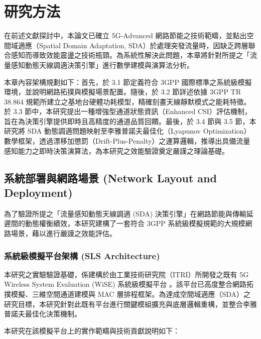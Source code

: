 
\section{研究方法}
\label{sec:methodology}
在前述文獻探討中，本論文已確立 5G-Advanced 網路節能之技術範疇，並點出空間域適應（Spatial Domain Adaptation, SDA）於處理突發流量時，因缺乏跨層聯合感知而導致效能震盪之技術瓶頸。為系統性解決此問題，本章將針對所提之「流量感知動態天線調適決策引擎」進行數學建模與演算法分析。

本章內容架構規劃如下：首先，於 3.1 節定義符合 3GPP 國際標準之系統級模擬環境，並說明網路拓撲與模擬場景配置。隨後，於 3.2 節詳述依據 3GPP TR 38.864 規範所建立之基地台硬體功耗模型，精確刻畫天線靜默模式之能耗特徵。於 3.3 節中，本研究提出一種增強型通道狀態資訊（Enhanced CSI）評估機制，旨在為決策引擎提供即時且高精度的通道品質回饋。最後，於 3.4 節與 3.5 節，本研究將 SDA 動態調適問題映射至李雅普諾夫最佳化（Lyapunov Optimization）數學框架，透過漂移加懲罰（Drift-Plus-Penalty）之運算邏輯，推導出具備流量感知能力之即時決策演算法，為本研究之效能驗證奠定嚴謹之理論基礎。

\subsection{系統部署與網路場景 (Network Layout and Deployment)}
為了驗證所提之「流量感知動態天線調適 (SDA) 決策引擎」在網路節能與傳輸延遲間的動態權衡績效，本研究建構了一套符合 3GPP 系統級模擬規範的大規模網路場景，藉以進行嚴謹之效能評估。
\subsubsection{系統級模擬平台架構 (SLS Architecture)}
本研究之實驗驗證基礎，係建構於由工業技術研究院（ITRI）所開發之既有 5G Wireless System Evaluation (WiSE) 系統級模擬平台 \cite{jao_wise_5g}。該平台已高度整合網路拓撲模擬、三維空間通道建模與 MAC 層排程框架。為達成空間域適應（SDA）之研究目標，本研究針對此既有平台進行關鍵模組擴充與底層邏輯重構，並整合李雅普諾夫最佳化決策機制。

本研究在該模擬平台上的實作範疇與技術貢獻說明如下：

